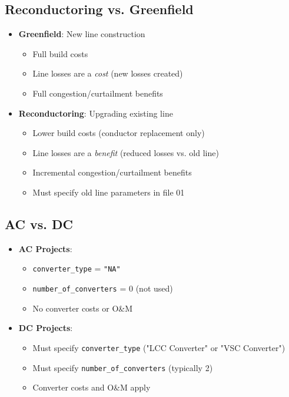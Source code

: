\documentclass[ctcc_full_documentation.tex]{subfiles}
\begin{document}
\subsection{Reconductoring vs. Greenfield}

\begin{itemize}
    \item \textbf{Greenfield}: New line construction
    \begin{itemize}
        \item Full build costs
        \item Line losses are a \textit{cost} (new losses created)
        \item Full congestion/curtailment benefits
    \end{itemize}
    
    \item \textbf{Reconductoring}: Upgrading existing line
    \begin{itemize}
        \item Lower build costs (conductor replacement only)
        \item Line losses are a \textit{benefit} (reduced losses vs. old line)
        \item Incremental congestion/curtailment benefits
        \item Must specify old line parameters in file 01
    \end{itemize}
\end{itemize}

\subsection{AC vs. DC}

\begin{itemize}
    \item \textbf{AC Projects}:
    \begin{itemize}
        \item \texttt{converter\_type} = \texttt{"NA"}
        \item \texttt{number\_of\_converters} = 0 (not used)
        \item No converter costs or O\&M
    \end{itemize}
    
    \item \textbf{DC Projects}:
    \begin{itemize}
        \item Must specify \texttt{converter\_type} ("LCC Converter" or "VSC Converter")
        \item Must specify \texttt{number\_of\_converters} (typically 2)
        \item Converter costs and O\&M apply
    \end{itemize}
\end{itemize}
\end{document}
